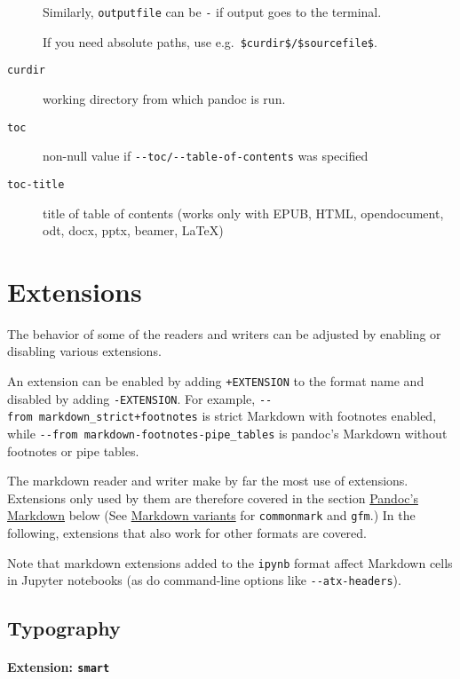 \documentclass[]{article}
\begin{document}
\begin{description}
Similarly, \texttt{outputfile} can be \texttt{-} if output goes to the
terminal.

If you need absolute paths, use e.g.~\texttt{\$curdir\$/\$sourcefile\$}.
\item[\texttt{curdir}]
working directory from which pandoc is run.
\item[\texttt{toc}]
non-null value if \texttt{-\/-toc/-\/-table-of-contents} was specified
\item[\texttt{toc-title}]
title of table of contents (works only with EPUB, HTML, opendocument,
odt, docx, pptx, beamer, LaTeX)
\end{description}

\hypertarget{extensions}{%
\section{Extensions}\label{extensions}}

The behavior of some of the readers and writers can be adjusted by
enabling or disabling various extensions.

An extension can be enabled by adding \texttt{+EXTENSION} to the format
name and disabled by adding \texttt{-EXTENSION}. For example,
\texttt{-\/-from\ markdown\_strict+footnotes} is strict Markdown with
footnotes enabled, while
\texttt{-\/-from\ markdown-footnotes-pipe\_tables} is pandoc's Markdown
without footnotes or pipe tables.

The markdown reader and writer make by far the most use of extensions.
Extensions only used by them are therefore covered in the section
\protect\hyperlink{pandocs-markdown}{Pandoc's Markdown} below (See
\protect\hyperlink{markdown-variants}{Markdown variants} for
\texttt{commonmark} and \texttt{gfm}.) In the following, extensions that
also work for other formats are covered.

Note that markdown extensions added to the \texttt{ipynb} format affect
Markdown cells in Jupyter notebooks (as do command-line options like
\texttt{-\/-atx-headers}).

\hypertarget{typography}{%
\subsection{Typography}\label{typography}}

\hypertarget{extension-smart}{%
\paragraph{\texorpdfstring{Extension:
\texttt{smart}}{Extension: smart}}\label{extension-smart}}
\end{document}

